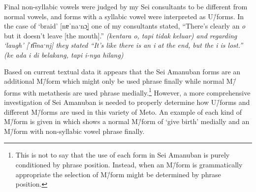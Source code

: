 Final non-syllabic vowels were judged by my Se{\Q}i consultants
to be different from normal vowels, and forms
with a syllabic vowel were interpreted as U\=/forms.
In the case of  `braid' [nɐˈnaˑnɔ̯]
 one of my consultants stated,
``There's clearly an \emph{o} but it doesn't leave [the mouth].''
\it{(kentara \emph{o}, tapi tidak keluar)}
and regarding  `laugh' [ˈn͡maˑnj] 
they stated ``It's like there is an \emph{i}
at the end, but the \emph{i} is lost.'' \it{(ke ada \emph{i}
di belakang, tapi \emph{i}-nya hilang})

Based on current textual data it appears that the
Se{\Q}i Amanuban forms are an additional M\=/form
which might only be used phrase finally while normal M\=/forms with
metathesis are used phrase medially.\footnote{
		This is not to say that the use of each
		form in Se{\Q}i Amanuban is purely conditioned
		by phrase position. Instead, when an M\=/form is
		grammatically appropriate the selection of M\=/form
		might be determined by phrase position.}
However, a more comprehensive investigation of Se{\Q}i Amanuban
is needed to properly determine how U\=/forms and
different M\=/forms are used in this variety of Meto.
An example of each kind of M\=/form is given in
 which shows a
normal M\=/form of  `give birth'
medially and an M\=/form with non-syllabic vowel
phrase finally.

\begin{exe}
	\label{ex:NB-171026-4, 0.56}
\end{exe}

